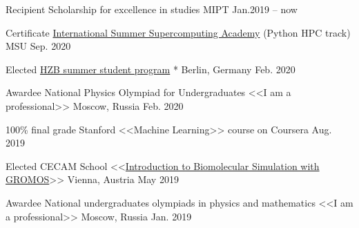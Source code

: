 
\begin{cvhonors}

  \cvhonor
    {Recipient} %
    {Scholarship for excellence in studies} %
    {MIPT} %
    {Jan.2019 -- now} %

  \cvhonor
    {Certificate} %
    {\href{http://academy.hpc-russia.ru/en/organizers}{International Summer Supercomputing Academy} (Python HPC track)} %
    {MSU} %
    {Sep. 2020} %
        
  \cvhonor
    {Elected} %
    {\href{https://www.helmholtz-berlin.de/jobskarriere/sommerstudenten/index_en.html}{HZB summer student program}} %
    {* Berlin, Germany} %
    {Feb. 2020} %
    
  \cvhonor
    {Awardee} %
    {National Physics Olympiad for Undergraduates <<I am a professional>>} %
    {Moscow, Russia} %
    {Feb. 2020} %
        
  \cvhonor
    {100\% final grade} %
    {Stanford <<Machine Learning>> course on Coursera} %
    {} %
    {Aug. 2019} %
    
  \cvhonor
    {Elected} %
    {CECAM School <<\href{https://www.cecam.org/workshop-details/129}{Introduction to Biomolecular Simulation with GROMOS}>>} %
    {Vienna, Austria} %
    {May 2019} %
        
    
  \cvhonor
    {Awardee} %
    {National undergraduates olympiads in physics and mathematics <<I am a professional>>} %
    {Moscow, Russia} %
    {Jan. 2019} %
    

\end{cvhonors}
